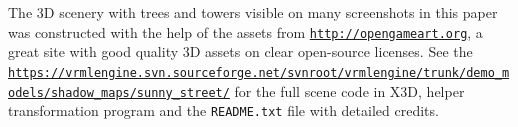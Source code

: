 \documentclass{acmsiggraph}                     %
\newcommand*{\myhref}[2]{\texttt{\href{#1}{\nolinkurl{#2}}}}
\begin{document}
The 3D scenery with trees and towers visible on many screenshots in this paper
was constructed with the help of the assets from \myhref{http://opengameart.org}{http://opengameart.org},
a great site with good quality 3D assets on clear open-source licenses.
See the \myhref{https://vrmlengine.svn.sourceforge.net/svnroot/vrmlengine/trunk/demo\_models/shadow\_maps/sunny\_street/}{https://vrmlengine.svn.sourceforge.net/svnroot/vrmlengine/trunk/demo_models/shadow_maps/sunny_street/}
for the full scene code in X3D, helper transformation program and the
\texttt{README.txt} file with detailed credits.



\nocite{*}

\end{document}
